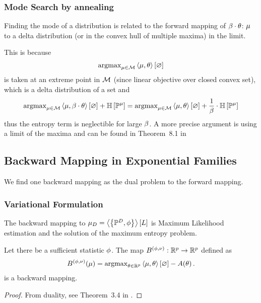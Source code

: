 \subsubsection{Mode Search by annealing}

Finding the mode of a distribution is related to the forward mapping of $\beta\cdot\theta$: $\mu$ to a delta distribution (or in the convex hull of multiple maxima) in the limit.

This is because 
\begin{align*}
	\mathrm{argmax}_{\mu\in\mathcal{M}}  \left\langle \mu,\theta\right\rangle \left[ \varnothing \right] 
\end{align*}
is taken at an extreme point in $\mathcal{M}$ (since linear objective over closed convex set), which is a delta distribution of a set and
\begin{align*}
	\mathrm{argmax}_{\mu\in\mathcal{M}}  \left\langle \mu,\beta\cdot\theta\right\rangle \left[ \varnothing \right] + \mathbb{H}\left[\mathbb{P}^{\mu}\right] 
	= 
	\mathrm{argmax}_{\mu\in\mathcal{M}}  \left\langle \mu,\theta\right\rangle \left[ \varnothing \right] + \frac{1}{\beta} \cdot \mathbb{H}\left[\mathbb{P}^{\mu}\right] 	
\end{align*}
thus the entropy term is neglectible for large $\beta$.
A more precise argument is using a limit of the maxima and can be found in Theorem~8.1 in \cite{wainwright_graphical_2008}





\subsection{Backward Mapping in Exponential Families}

We find one backward mapping as the dual problem to the forward mapping.

\subsubsection{Variational Formulation}

The backward mapping to $\mu_{D} = \left\langle \left\{\mathbb{P}^{D}, \phi\right\}\right\rangle \left[ L \right]$ is Maximum Likelihood estimation and the solution of the maximum entropy problem.

\begin{lemma}
	Let there be a sufficient statistic $\phi$.
	The map $B^{(\phi,\nu)}: \mathbb{R}^{p}\rightarrow \mathbb{R}^{p}$ defined as
	\begin{align*}
		B^{(\phi,\nu)}(\mu) = \mathrm{argmax}_{\theta\in\mathbb{R}^{p}}  \left\langle \mu,\theta\right\rangle \left[ \varnothing \right] - A(\theta) \, . 
	\end{align*}
	is a backward mapping.
\end{lemma}
\begin{proof}
	From duality, see Theorem~3.4 in \cite{wainwright_graphical_2008}.
\end{proof}

